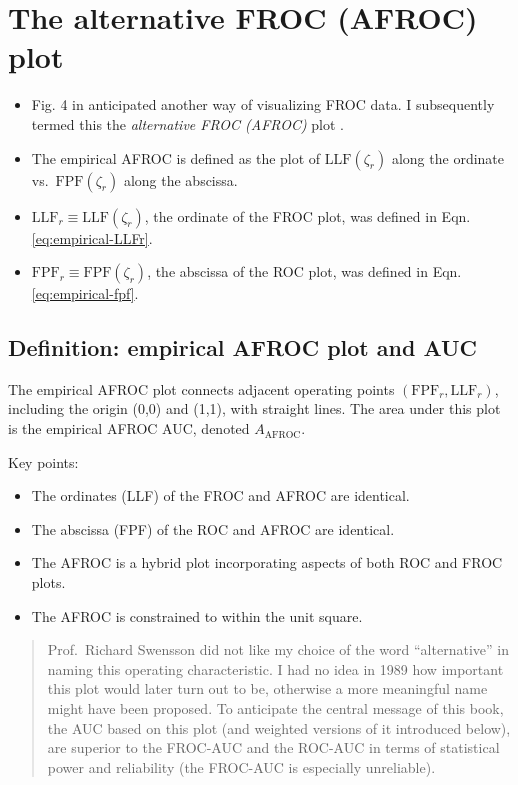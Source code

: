 \documentclass[
]{book}
\providecommand{\tightlist}{%
  \setlength{\itemsep}{0pt}\setlength{\parskip}{0pt}}
\begin{document}
\hypertarget{empirical-AFROC}{%
\section{The alternative FROC (AFROC) plot}\label{empirical-AFROC}}

\begin{itemize}
\tightlist
\item
  Fig. 4 in \citep{bunch1977free} anticipated another way of visualizing FROC data. I subsequently termed this the \emph{alternative FROC (AFROC)} plot \citep{chakraborty1989maximum}.
\item
  The empirical AFROC is defined as the plot of \(\text{LLF}(\zeta_r)\) along the ordinate vs.~\(\text{FPF}(\zeta_r)\) along the abscissa.
\item
  \(\text{LLF}_r \equiv \text{LLF}(\zeta_r)\), the ordinate of the FROC plot, was defined in Eqn. \eqref{eq:empirical-LLFr}.
\item
  \(\text{FPF}_r \equiv \text{FPF}(\zeta_r)\), the abscissa of the ROC plot, was defined in Eqn. \eqref{eq:empirical-fpf}.
\end{itemize}

\hypertarget{empirical-definition-empirical-auc-afroc}{%
\subsection{Definition: empirical AFROC plot and AUC}\label{empirical-definition-empirical-auc-afroc}}

The empirical AFROC plot connects adjacent operating points \(\left( \text{FPF}_r, \text{LLF}_r \right )\), including the origin (0,0) and (1,1), with straight lines. The area under this plot is the empirical AFROC AUC, denoted \(A_{\text{AFROC}}\).

Key points:

\begin{itemize}
\tightlist
\item
  The ordinates (LLF) of the FROC and AFROC are identical.
\item
  The abscissa (FPF) of the ROC and AFROC are identical.
\item
  The AFROC is a hybrid plot incorporating aspects of both ROC and FROC plots.
\item
  The AFROC is constrained to within the unit square.
\end{itemize}

\begin{quote}
Prof.~Richard Swensson did not like my choice of the word ``alternative'' in naming this operating characteristic. I had no idea in 1989 how important this plot would later turn out to be, otherwise a more meaningful name might have been proposed. To anticipate the central message of this book, the AUC based on this plot (and weighted versions of it introduced below), are superior to the FROC-AUC and the ROC-AUC in terms of statistical power and reliability (the FROC-AUC is especially unreliable).
\end{quote}
\end{document}
